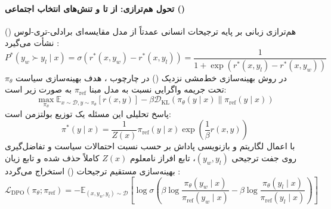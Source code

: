 \paragraph*{تحول هم‌ترازی: از  تا  و تنش‌های انتخاب اجتماعی ()}
هم‌ترازی زبانی بر پایه ترجیحات انسانی عمدتاً از مدل مقایسه‌ای برادلی-تری-لوس () نشأت می‌گیرد \cite{bradley1952rank, ouyang2022training, xiao2024survey}:
\begin{equation}
    P^*(y_w \succ y_l \mid x) = \sigma(r^*(x, y_w) - r^*(x, y_l)) = \frac{1}{1 + \exp(r^*(x, y_l) - r^*(x, y_w))}
\end{equation}
در روش بهینه‌سازی خط‌مشی نزدیک () در چارچوب ، هدف بهینه‌سازی سیاست $\pi_\theta$ تحت جریمه واگرایی  نسبت به مدل مبنا $\pi_{\text{ref}}$ به صورت زیر است:
\begin{equation}
    \max_{\pi_\theta} \mathbb{E}_{x \sim \mathcal{D}, y \sim \pi_\theta} [r(x, y)] - \beta \mathcal{D}_{\text{KL}}(\pi_\theta(y \mid x) \parallel \pi_{\text{ref}}(y \mid x))
\end{equation}
پاسخ تحلیلی این مسئله یک توزیع بولتزمن است:
\begin{equation}
    \pi^*(y \mid x) = \frac{1}{Z(x)} \pi_{\text{ref}}(y \mid x) \exp\left(\frac{1}{\beta} r(x, y)\right)
\end{equation}
با اعمال لگاریتم و بازنویسی پاداش بر حسب نسبت احتمالات سیاست و تفاضل‌گیری روی جفت ترجیحی $(y_w, y_l)$، تابع افراز نامعلوم $Z(x)$ کاملاً حذف شده و تابع زیان بهینه‌سازی مستقیم ترجیحات () استخراج می‌گردد \cite{rafailov2023direct, xiao2024survey}:
\begin{equation}
    \mathcal{L}_{\text{DPO}}(\pi_\theta; \pi_{\text{ref}}) = - \mathbb{E}_{(x, y_w, y_l) \sim \mathcal{D}} \left[ \log \sigma \left( \beta \log \frac{\pi_\theta(y_w \mid x)}{\pi_{\text{ref}}(y_w \mid x)} - \beta \log \frac{\pi_\theta(y_l \mid x)}{\pi_{\text{ref}}(y_l \mid x)} \right) \right]
\end{equation}

